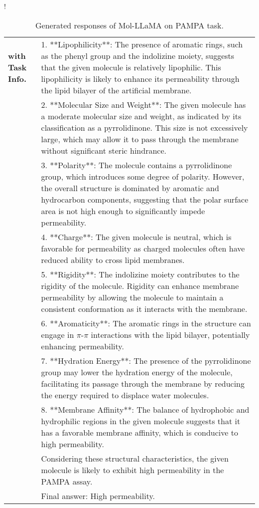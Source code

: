 \begin{table}[ht!]
\begin{resizebox}{\linewidth}{!}
{\begin{tabular}{p{1.2cm} p{18cm}}
\midrule



\textbf{with Task Info.} & 1. **Lipophilicity**: The presence of aromatic rings, such as the phenyl group and the indolizine moiety, suggests that the given molecule is relatively lipophilic. This lipophilicity is likely to enhance its permeability through the lipid bilayer of the artificial membrane.  \\

& 2. **Molecular Size and Weight**: The given molecule has a moderate molecular size and weight, as indicated by its classification as a pyrrolidinone. This size is not excessively large, which may allow it to pass through the membrane without significant steric hindrance. \\

& 3. **Polarity**: The molecule contains a pyrrolidinone group, which introduces some degree of polarity. However, the overall structure is dominated by aromatic and hydrocarbon components, suggesting that the polar surface area is not high enough to significantly impede permeability. \\

& 4. **Charge**: The given molecule is neutral, which is favorable for permeability as charged molecules often have reduced ability to cross lipid membranes. \\

& 5. **Rigidity**: The indolizine moiety contributes to the rigidity of the molecule. Rigidity can enhance membrane permeability by allowing the molecule to maintain a consistent conformation as it interacts with the membrane. \\

& 6. **Aromaticity**: The aromatic rings in the structure can engage in $\pi$-$\pi$ interactions with the lipid bilayer, potentially enhancing permeability. \\

& 7. **Hydration Energy**: The presence of the pyrrolidinone group may lower the hydration energy of the molecule, facilitating its passage through the membrane by reducing the energy required to displace water molecules. \\

& 8. **Membrane Affinity**: The balance of hydrophobic and hydrophilic regions in the given molecule suggests that it has a favorable membrane affinity, which is conducive to high permeability. \\

& Considering these structural characteristics, the given molecule is likely to exhibit high permeability in the PAMPA assay. \\

& Final answer: High permeability. \\
\bottomrule
\end{tabular}}
\end{resizebox}
\vspace{-0.1in}
\caption{Generated responses of Mol-LLaMA on PAMPA task.}
\label{app:tab:pampa_MolLLaMA}
\end{table}
